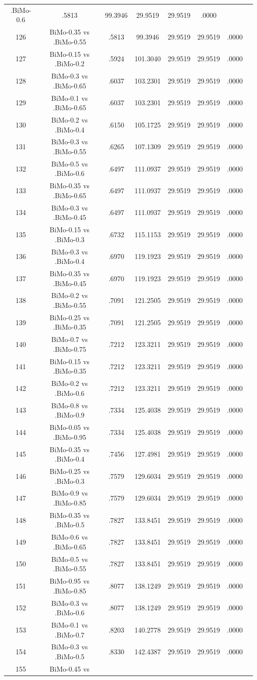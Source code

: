 \documentclass[a4paper,10pt]{article}
\begin{document}
\begin{landscape}
\begin{table}[!htp]
\begin{tabular}{cccccccc}
.BiMo-0.6&.5813&99.3946&29.9519&29.9519&.0000\\126&BiMo-0.35 vs .BiMo-0.55&.5813&99.3946&29.9519&29.9519&.0000\\127&BiMo-0.15 vs .BiMo-0.2&.5924&101.3040&29.9519&29.9519&.0000\\128&BiMo-0.3 vs .BiMo-0.65&.6037&103.2301&29.9519&29.9519&.0000\\129&BiMo-0.1 vs .BiMo-0.65&.6037&103.2301&29.9519&29.9519&.0000\\130&BiMo-0.2 vs .BiMo-0.4&.6150&105.1725&29.9519&29.9519&.0000\\131&BiMo-0.3 vs .BiMo-0.55&.6265&107.1309&29.9519&29.9519&.0000\\132&BiMo-0.5 vs .BiMo-0.6&.6497&111.0937&29.9519&29.9519&.0000\\133&BiMo-0.35 vs .BiMo-0.65&.6497&111.0937&29.9519&29.9519&.0000\\134&BiMo-0.3 vs .BiMo-0.45&.6497&111.0937&29.9519&29.9519&.0000\\135&BiMo-0.15 vs .BiMo-0.3&.6732&115.1153&29.9519&29.9519&.0000\\136&BiMo-0.3 vs .BiMo-0.4&.6970&119.1923&29.9519&29.9519&.0000\\137&BiMo-0.35 vs .BiMo-0.45&.6970&119.1923&29.9519&29.9519&.0000\\138&BiMo-0.2 vs .BiMo-0.55&.7091&121.2505&29.9519&29.9519&.0000\\139&BiMo-0.25 vs .BiMo-0.35&.7091&121.2505&29.9519&29.9519&.0000\\140&BiMo-0.7 vs .BiMo-0.75&.7212&123.3211&29.9519&29.9519&.0000\\141&BiMo-0.15 vs .BiMo-0.35&.7212&123.3211&29.9519&29.9519&.0000\\142&BiMo-0.2 vs .BiMo-0.6&.7212&123.3211&29.9519&29.9519&.0000\\143&BiMo-0.8 vs .BiMo-0.9&.7334&125.4038&29.9519&29.9519&.0000\\144&BiMo-0.05 vs .BiMo-0.95&.7334&125.4038&29.9519&29.9519&.0000\\145&BiMo-0.35 vs .BiMo-0.4&.7456&127.4981&29.9519&29.9519&.0000\\146&BiMo-0.25 vs .BiMo-0.3&.7579&129.6034&29.9519&29.9519&.0000\\147&BiMo-0.9 vs .BiMo-0.85&.7579&129.6034&29.9519&29.9519&.0000\\148&BiMo-0.35 vs .BiMo-0.5&.7827&133.8451&29.9519&29.9519&.0000\\149&BiMo-0.6 vs .BiMo-0.65&.7827&133.8451&29.9519&29.9519&.0000\\150&BiMo-0.5 vs .BiMo-0.55&.7827&133.8451&29.9519&29.9519&.0000\\151&BiMo-0.95 vs .BiMo-0.85&.8077&138.1249&29.9519&29.9519&.0000\\152&BiMo-0.3 vs .BiMo-0.6&.8077&138.1249&29.9519&29.9519&.0000\\153&BiMo-0.1 vs .BiMo-0.7&.8203&140.2778&29.9519&29.9519&.0000\\154&BiMo-0.3 vs .BiMo-0.5&.8330&142.4387&29.9519&29.9519&.0000\\155&BiMo-0.45 vs 
\end{tabular}
\end{table}
\end{landscape}
\end{document}
